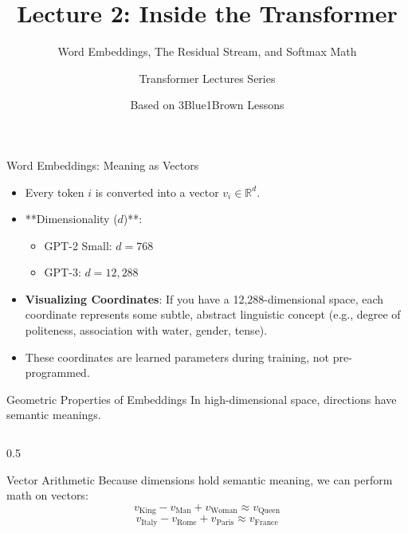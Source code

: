 \documentclass[aspectratio=169]{beamer}
\title{Lecture 2: Inside the Transformer}
\subtitle{Word Embeddings, The Residual Stream, and Softmax Math}
\author{Transformer Lectures Series}
\date{Based on 3Blue1Brown Lessons}
\begin{document}
\begin{frame}[plain]
  \titlepage
\end{frame}

\begin{frame}{Word Embeddings: Meaning as Vectors}
  \begin{itemize}
    \item Every token $i$ is converted into a vector $v_i \in \mathbb{R}^d$.
    \item **Dimensionality ($d$)**: 
      \begin{itemize}
        \item GPT-2 Small: $d = 768$
        \item GPT-3: $d = 12,288$
      \end{itemize}
    \item \textbf{Visualizing Coordinates}: If you have a 12,288-dimensional space, each coordinate represents some subtle, abstract linguistic concept (e.g., degree of politeness, association with water, gender, tense).
    \item These coordinates are learned parameters during training, not pre-programmed.
  \end{itemize}
\end{frame}

\begin{frame}{Geometric Properties of Embeddings}
  In high-dimensional space, directions have semantic meanings.
  
  \begin{columns}
    \begin{column}{0.5\textwidth}
      \begin{block}{Vector Arithmetic}
        Because dimensions hold semantic meaning, we can perform math on vectors:
        \[
        v_{\text{King}} - v_{\text{Man}} + v_{\text{Woman}} \approx v_{\text{Queen}}
        \]
        \[
        v_{\text{Italy}} - v_{\text{Rome}} + v_{\text{Paris}} \approx v_{\text{France}}
        \]
      \end{block}
    \end{column}
    
  \end{columns}
\end{frame}
\end{document}
